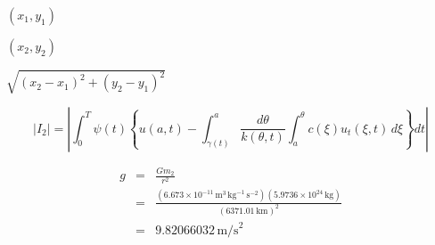 \documentclass{article}
\begin{document}
$(x_1,y_1)$
\pagebreak

$(x_2,y_2)$
\pagebreak

$\sqrt{(x_2-x_1)^2+(y_2-y_1)^2}$
\pagebreak

\[ |I_2|=\left| \int_{0}^T \psi(t) \left\{ u(a,t)- \int_{\gamma(t)}^a \frac{d\theta}{k(\theta,t)} \int_{a}^\theta c(\xi)u_t(\xi,t)\,d\xi \right\} dt \right| \]
\pagebreak

\begin{eqnarray*} g &=& \frac{Gm_2}{r^2} \\ &=& \frac{(6.673 \times 10^{-11}\,\mbox{m}^3\,\mbox{kg}^{-1}\, \mbox{s}^{-2})(5.9736 \times 10^{24}\,\mbox{kg})}{(6371.01\,\mbox{km})^2} \\ &=& 9.82066032\,\mbox{m/s}^2 \end{eqnarray*}
\pagebreak
\end{document}
